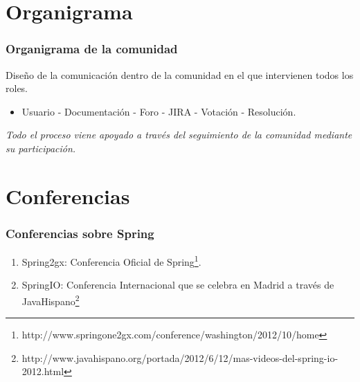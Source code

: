 \documentclass[xcolor=dvipsnames]{beamer}
\begin{document}
\section{Organigrama}
\begin{frame}[allowframebreaks]
\frametitle{Organigrama de la comunidad}
Dise\~no de la comunicaci\'on dentro de la comunidad en el que intervienen todos los roles.
\begin{itemize}
    \item Usuario - Documentaci\'on - Foro - JIRA - Votaci\'on - Resoluci\'on.
\end{itemize}
\emph{Todo el proceso viene apoyado a trav\'es del seguimiento de la comunidad mediante su participaci\'on.}
\end{frame}

\section{Conferencias}
\begin{frame}[allowframebreaks]
\frametitle{Conferencias sobre Spring}
\begin{enumerate}
\item Spring2gx: Conferencia Oficial de Spring\footnote{http://www.springone2gx.com/conference/washington/2012/10/home}.
\item SpringIO: Conferencia Internacional que se celebra en Madrid a trav\'es de JavaHispano\footnote{http://www.javahispano.org/portada/2012/6/12/mas-videos-del-spring-io-2012.html}
\end{enumerate}
\end{frame}
\end{document}
